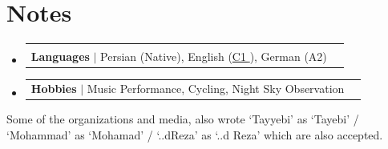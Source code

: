 \documentclass[11pt,a4paper]{article}
\makeatletter
\let\orighref\href
\renewcommand{\href}[2]{\orighref{#1}{#2\,{\textsuperscript{\tiny{\textcolor{heritagered}{\faExternalLink}}}}}}
\newcommand{\deemph}[1]{{\color{gray}#1}}
\newcommand{\resumeProjectHeading}[2]{
    \item
    \begin{tabular*}{0.97\textwidth}{l@{\extracolsep{\fill}}r}
      \small#1 & \deemph{#2} \\
    \end{tabular*}\vspace{-7pt}
}
\newcommand{\resumeSubHeadingListStart}{\begin{itemize}[leftmargin=0.15in, label={}]}
\newcommand{\resumeSubHeadingListEnd}{\end{itemize}}
\makeatother
\begin{document}
    


\section{Notes}
    \resumeSubHeadingListStart

      \resumeProjectHeading{\textbf{Languages} $|$ Persian (Native), English (\href{https://www.efset.org/cert/nZZPzS}{C1}), German (A2)}{}
      \resumeProjectHeading{\textbf{Hobbies} $|$ Music Performance, Cycling, Night Sky Observation}{}
      
    \resumeSubHeadingListEnd        


\mbox{}
\vfill
\leavevmode
\tiny
\deemph{Some of the organizations and media, also wrote ‘Tayyebi’ as ‘Tayebi’ / ‘Mohammad’ as ‘Mohamad’ / ‘..dReza’ as ‘..d Reza’ which are also accepted.}
\end{document}
